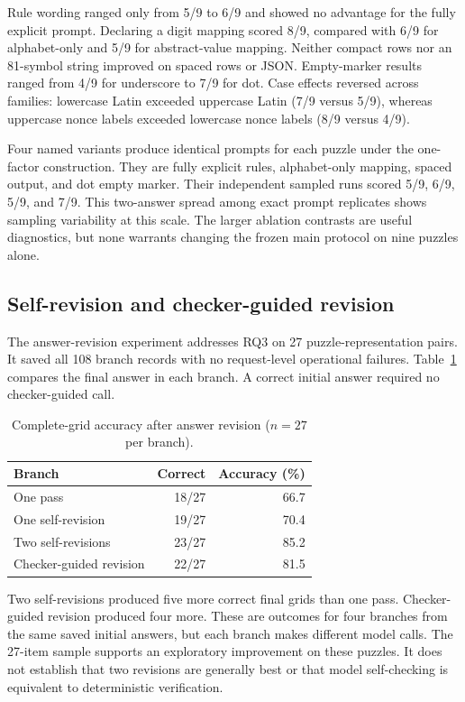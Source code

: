 \documentclass[11pt,a4paper]{article}
\begin{document}
Rule wording ranged only from 5/9 to 6/9 and showed no advantage for the fully explicit prompt. Declaring a digit mapping scored 8/9, compared with 6/9 for alphabet-only and 5/9 for abstract-value mapping. Neither compact rows nor an 81-symbol string improved on spaced rows or JSON. Empty-marker results ranged from 4/9 for underscore to 7/9 for dot. Case effects reversed across families: lowercase Latin exceeded uppercase Latin (7/9 versus 5/9), whereas uppercase nonce labels exceeded lowercase nonce labels (8/9 versus 4/9).

Four named variants produce identical prompts for each puzzle under the one-factor construction. They are fully explicit rules, alphabet-only mapping, spaced output, and dot empty marker. Their independent sampled runs scored 5/9, 6/9, 5/9, and 7/9. This two-answer spread among exact prompt replicates shows sampling variability at this scale. The larger ablation contrasts are useful diagnostics, but none warrants changing the frozen main protocol on nine puzzles alone.

\subsection{Self-revision and checker-guided revision}
The answer-revision experiment addresses RQ3 on 27 puzzle-representation pairs. It saved all 108 branch records with no request-level operational failures. Table~\ref{tab:revision} compares the final answer in each branch. A correct initial answer required no checker-guided call.

\begin{table}[H]
\centering
\caption{Complete-grid accuracy after answer revision ($n=27$ per branch).}
\label{tab:revision}
\begin{tabular}{lrr}
\toprule
Branch & Correct & Accuracy (\%) \\
\midrule
One pass & 18/27 & 66.7 \\
One self-revision & 19/27 & 70.4 \\
Two self-revisions & 23/27 & 85.2 \\
Checker-guided revision & 22/27 & 81.5 \\
\bottomrule
\end{tabular}
\end{table}

Two self-revisions produced five more correct final grids than one pass. Checker-guided revision produced four more. These are outcomes for four branches from the same saved initial answers, but each branch makes different model calls. The 27-item sample supports an exploratory improvement on these puzzles. It does not establish that two revisions are generally best or that model self-checking is equivalent to deterministic verification.
\end{document}
